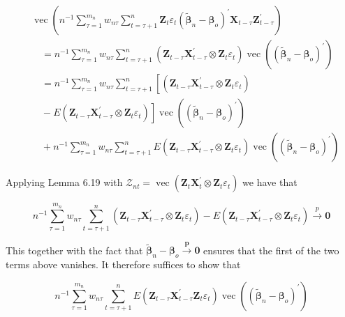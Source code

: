 \documentclass[10pt]{article}
\begin{document}
$$
\begin{aligned}
& \operatorname{vec}\left(n^{-1} \sum_{\tau=1}^{m_{n}} w_{n \tau} \sum_{t=\tau+1}^{n} \mathbf{Z}_{t} \varepsilon_{t}\left(\tilde{\boldsymbol{\beta}}_{n}-\boldsymbol{\beta}_{o}\right)^{\prime} \mathbf{X}_{t-\tau} \mathbf{Z}_{t-\tau}^{\prime}\right) \\
& \quad=n^{-1} \sum_{\tau=1}^{m_{n}} w_{n \tau} \sum_{t=\tau+1}^{n}\left(\mathbf{Z}_{t-\tau} \mathbf{X}_{t-\tau}^{\prime} \otimes \mathbf{Z}_{t} \varepsilon_{t}\right) \operatorname{vec}\left(\left(\tilde{\boldsymbol{\beta}}_{n}-\boldsymbol{\beta}_{o}\right)^{\prime}\right) \\
& \quad=n^{-1} \sum_{\tau=1}^{m_{n}} w_{n \tau} \sum_{t=\tau+1}^{n}\left[\left(\mathbf{Z}_{t-\tau} \mathbf{X}_{t-\tau}^{\prime} \otimes \mathbf{Z}_{t} \varepsilon_{t}\right)\right. \\
& \left.\quad-E\left(\mathbf{Z}_{t-\tau} \mathbf{X}_{t-\tau}^{\prime} \otimes \mathbf{Z}_{t} \varepsilon_{t}\right)\right] \operatorname{vec}\left(\left(\tilde{\boldsymbol{\beta}}_{n}-\boldsymbol{\beta}_{o}\right)^{\prime}\right) \\
& \quad+n^{-1} \sum_{\tau=1}^{m_{n}} w_{n \tau} \sum_{t=\tau+1}^{n} E\left(\mathbf{Z}_{t-\tau} \mathbf{X}_{t-\tau}^{\prime} \otimes \mathbf{Z}_{t} \varepsilon_{t}\right) \operatorname{vec}\left(\left(\tilde{\boldsymbol{\beta}}_{n}-\boldsymbol{\beta}_{o}\right)^{\prime}\right)
\end{aligned}
$$

Applying Lemma 6.19 with $\mathcal{Z}_{n t}=\operatorname{vec}\left(\mathbf{Z}_{t} \mathbf{X}_{t}^{\prime} \otimes \mathbf{Z}_{t} \varepsilon_{t}\right)$ we have that

$$
n^{-1} \sum_{\tau=1}^{m_{n}} w_{n \tau} \sum_{t=\tau+1}^{n}\left(\mathbf{Z}_{t-\tau} \mathbf{X}_{t-\tau}^{\prime} \otimes \mathbf{Z}_{t} \varepsilon_{t}\right)-E\left(\mathbf{Z}_{t-\tau} \mathbf{X}_{t-\tau}^{\prime} \otimes \mathbf{Z}_{t} \varepsilon_{t}\right) \xrightarrow{p} \mathbf{0}
$$

This together with the fact that $\tilde{\boldsymbol{\beta}}_{n}-\boldsymbol{\beta}_{o} \xrightarrow{\boldsymbol{p}} \mathbf{0}$ ensures that the first of the two terms above vanishes. It therefore suffices to show that

$$
n^{-1} \sum_{\tau=1}^{m_{n}} w_{n \tau} \sum_{t=\tau+1}^{n} E\left(\mathbf{Z}_{t-\tau} \mathbf{X}_{t-\tau}^{\prime} \mathbf{Z}_{t} \varepsilon_{t}\right) \operatorname{vec}\left(\left(\tilde{\boldsymbol{\beta}}_{n}-\boldsymbol{\beta}_{o}\right)^{\prime}\right)
$$
\end{document}
